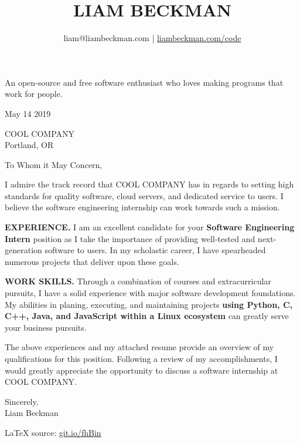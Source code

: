 


\title{\textcolor{my-red}{LIAM BECKMAN}}
\author{liam@liambeckman.com | \href{https://liambeckman.com/code}{liambeckman.com/code}}

\date{\vspace{-5ex}}



\maketitle

\begin{center}
An open-source and free software enthusiast who loves making programs that work for people.
\end{center}

\textcolor{my-grey}{\dotfill}
\bigbreak

May 14 2019\\
\bigbreak

COOL COMPANY\\
Portland, OR\\

\bigbreak

To Whom it May Concern,

\bigbreak

I admire the track record that COOL COMPANY has in regards to setting high standards for quality software, cloud servers, and dedicated service to users. I believe the software engineering internship can work towards such a mission.

\bigbreak

\textbf{EXPERIENCE.} I am an excellent candidate for your \textbf{Software Engineering Intern} position as I take the importance of providing well-tested and next-generation software to users. In my scholastic career, I have spearheaded numerous projects that deliver upon these goals.

\bigbreak

\textbf{WORK SKILLS.} Through a combination of courses and extracurricular pursuits, I have a solid experience with major software development foundations. My abilities in planing, executing, and maintaining projects \textbf{using Python, C, C++, Java, and JavaScript within a Linux ecosystem} can greatly serve your business pursuits.

\bigbreak

The above experiences and my attached resume provide an overview of my qualifications for this position. Following a review of my accomplishments, I would greatly appreciate the opportunity to discuss a software internship at COOL COMPANY.

\bigbreak

Sincerely,\\

Liam Beckman

\vfill

\textcolor{my-grey}{\dotfill}
\medbreak
\hfill\textcolor{my-red}{\LaTeX{} source: \href{https://git.io/fhBin}{git.io/fhBin}}


